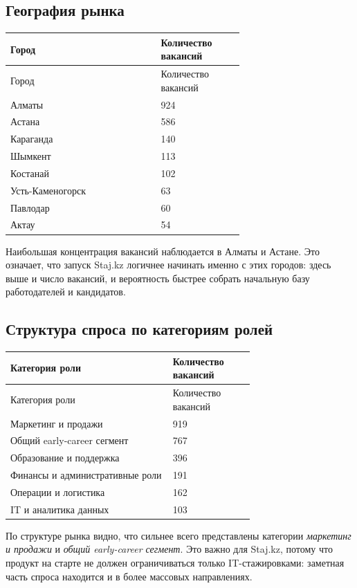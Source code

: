 \documentclass[12pt,a4paper]{article}
\begin{document}
\subsection{География рынка}
\begin{longtable}{p{0.45\linewidth}p{0.22\linewidth}}
\toprule
Город & Количество вакансий\\
\midrule
\endfirsthead
\toprule
Город & Количество вакансий\\
\midrule
\endhead
Алматы & 924\\
Астана & 586\\
Караганда & 140\\
Шымкент & 113\\
Костанай & 102\\
Усть-Каменогорск & 63\\
Павлодар & 60\\
Актау & 54\\
\bottomrule
\end{longtable}

Наибольшая концентрация вакансий наблюдается в Алматы и Астане. Это означает, что запуск Staj.kz логичнее начинать именно с этих городов: здесь выше и число вакансий, и вероятность быстрее собрать начальную базу работодателей и кандидатов.

\subsection{Структура спроса по категориям ролей}
\begin{longtable}{p{0.48\linewidth}p{0.22\linewidth}}
\toprule
Категория роли & Количество вакансий\\
\midrule
\endfirsthead
\toprule
Категория роли & Количество вакансий\\
\midrule
\endhead
Маркетинг и продажи & 919\\
Общий early-career сегмент & 767\\
Образование и поддержка & 396\\
Финансы и административные роли & 191\\
Операции и логистика & 162\\
IT и аналитика данных & 103\\
\bottomrule
\end{longtable}

По структуре рынка видно, что сильнее всего представлены категории \textit{маркетинг и продажи} и \textit{общий early-career сегмент}. Это важно для Staj.kz, потому что продукт на старте не должен ограничиваться только IT-стажировками: заметная часть спроса находится и в более массовых направлениях.
\end{document}
